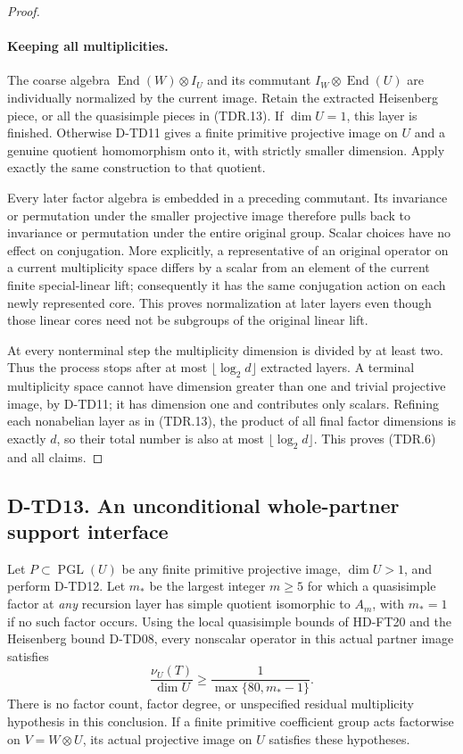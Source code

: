 \begin{proof}
\paragraph{Keeping all multiplicities.}
The coarse algebra $\operatorname{End}(W)\otimes I_U$ and its
commutant $I_W\otimes\operatorname{End}(U)$ are individually
normalized by the current image.  Retain the extracted Heisenberg
piece, or all the quasisimple pieces in (TDR.13).  If $\dim U=1$,
this layer is finished.  Otherwise D-TD11 gives a finite primitive
projective image on $U$ and a genuine quotient homomorphism onto
it, with strictly smaller dimension.  Apply exactly the same
construction to that quotient.

Every later factor algebra is embedded in a preceding commutant.
Its invariance or permutation under the smaller projective image
therefore pulls back to invariance or permutation under the entire
original group.  Scalar choices have no effect on conjugation.
More explicitly, a representative of an original operator on a
current multiplicity space differs by a scalar from an element
of the current finite special-linear lift; consequently it has
the same conjugation action on each newly represented core.
This proves normalization at later layers even though those
linear cores need not be subgroups of the original linear lift.

At every nonterminal step the multiplicity dimension is divided
by at least two.  Thus the process stops after at most
$\lfloor\log_2 d\rfloor$ extracted layers.  A terminal
multiplicity space cannot have dimension greater than one and
trivial projective image, by D-TD11; it has dimension one and
contributes only scalars.  Refining each nonabelian layer as in
(TDR.13), the product of all final factor dimensions is exactly
$d$, so their total number is also at most
$\lfloor\log_2 d\rfloor$.  This proves (TDR.6) and all claims.
\end{proof}

\subsection*{D-TD13. An unconditional whole-partner support interface}

\begin{corollary}[D-TD13]
Let $P\subset\operatorname{PGL}(U)$ be any finite primitive
projective image, $\dim U>1$, and perform D-TD12.  Let $m_*$ be
the largest integer $m\ge5$ for which a quasisimple factor at
\emph{any} recursion layer has simple quotient isomorphic to
$A_m$, with $m_*=1$ if no such factor occurs.  Using the local
quasisimple bounds of HD-FT20 and the Heisenberg bound D-TD08,
every nonscalar operator in this actual partner image satisfies
\[
 \frac{\nu_U(T)}{\dim U}\ge
      \frac1{\max\{80,m_*-1\}}.
 \tag{TDR.14}
\]
There is no factor count, factor degree, or unspecified residual
multiplicity hypothesis in this conclusion.  If a finite primitive
coefficient group acts factorwise on $V=W\otimes U$, its actual
projective image on $U$ satisfies these hypotheses.
\end{corollary}

